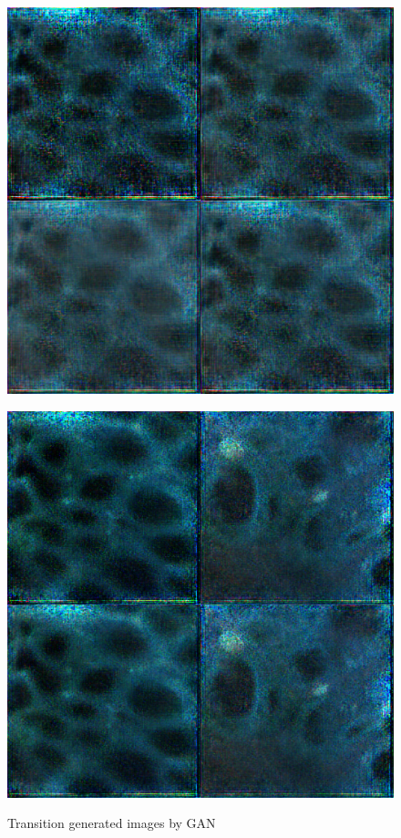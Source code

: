 \begin{figure}[H]
\begin{minipage}{0.24\columnwidth}
		\label{fig:}
	\end{minipage}
	\begin{minipage}{0.24\columnwidth}
		\centering
		\includegraphics[clip, width=\linewidth]{fig/generative_adversarial_nets/2004_0000}
		\label{fig:}
	\end{minipage}
	\begin{minipage}{0.24\columnwidth}
		\centering
		\includegraphics[clip, width=\linewidth]{fig/generative_adversarial_nets/3208_0000}
		\label{fig:}
	\end{minipage}
	
	\caption{Transition generated images by GAN}
	\label{fig:GANimage}
	
\end{figure}

